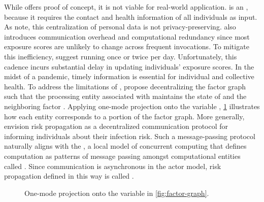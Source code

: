 While \cRiskPropagation offers proof of concept, it is not viable for real-world application. \cRiskPropagation is an  \citep{Cormen2022}, because it requires the contact and health information of all individuals as input. As \citet{Ayday2021} note, this centralization of personal data is not privacy-preserving. \cRiskPropagation also introduces communication overhead and computational redundancy since most exposure scores are unlikely to change across frequent invocations. To mitigate this inefficiency, \citet{Ayday2020} suggest running \cRiskPropagation once or twice per day. Unfortunately, this cadence incurs substantial delay in updating individuals' exposure scores. In the midst of a pandemic, timely information is essential for individual and collective health. To address the limitations of \cRiskPropagation, \citet{Ayday2021} propose decentralizing the factor graph such that the processing entity associated with  maintains the state of  and the neighboring factor \verticesName. Applying one-mode projection onto the variable \verticesName \citep{Zhou2007}, \cref{fig:projected} illustrates how each entity corresponds to a portion of the factor graph. More generally, \citet{Ayday2021} envision risk propagation as a decentralized communication protocol for informing individuals about their infection risk. Such a message-passing protocol naturally aligns with the , a local model of concurrent computing that defines computation as patterns of message passing amongst computational entities called  \citep{Hewitt1973, Hewitt1977a, Hewitt1977b,Clinger1981, Agha1985, De_Koster2016}. Since communication is asynchronous in the actor model, risk propagation defined in this way is called .

\begin{figure}[htbp]
\centering
{}
\caption[One-mode projection of the factor graph]{One-mode projection onto the variable \verticesName in \cref{fig:factor-graph}.}
\label{fig:projected}
\end{figure}

